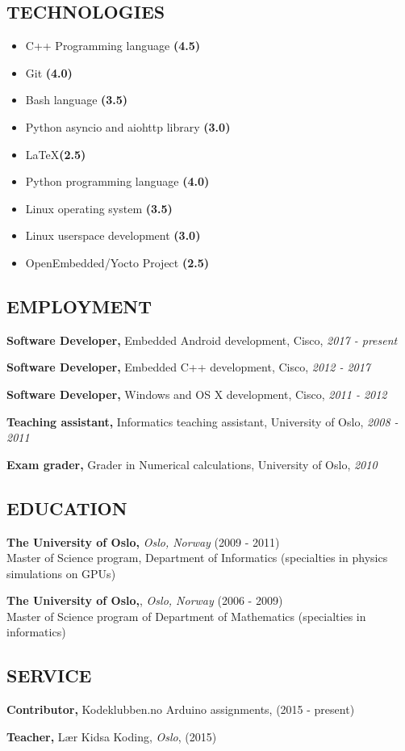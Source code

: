 \documentclass{article}
\begin{document}
\subsection*{TECHNOLOGIES}

\begin{multicols}{2}

  \begin{itemize}
    \item C++ Programming language {\bf (4.5)}
    \item Git {\bf (4.0)}
    \item Bash language {\bf (3.5)}
    \item Python asyncio and aiohttp library {\bf (3.0)}
    \item \LaTeX {\bf (2.5)}
    \item Python programming language {\bf (4.0)}
    \item Linux operating system {\bf (3.5)}
    \item Linux userspace development {\bf (3.0)}
    \item OpenEmbedded/Yocto Project {\bf (2.5)}
  \end{itemize}
\end{multicols}

\subsection*{EMPLOYMENT}

\begin{addmargin}[2em]{0em}
  {\bf Software Developer,} Embedded Android development, Cisco, {\it 2017 - present}

  {\bf Software Developer,} Embedded C++ development, Cisco, {\it 2012 - 2017}

  {\bf Software Developer,} Windows and OS X development, Cisco, {\it 2011 - 2012}

  {\bf Teaching assistant,} Informatics teaching assistant, University of Oslo, {\it 2008 - 2011}

  {\bf Exam grader,} Grader in Numerical calculations, University of Oslo, {\it 2010}
\end{addmargin}

\subsection*{EDUCATION}

\begin{addmargin}[2em]{0em}
  {\bf The University of Oslo,}  {\it Oslo, Norway} (2009 - 2011) \\
  Master of Science program, Department of Informatics (specialties in physics simulations on GPUs)

  {\bf The University of Oslo,}, {\it Oslo, Norway} (2006 - 2009) \\
  Master of Science program of Department of Mathematics (specialties in informatics)
\end{addmargin}

\subsection*{SERVICE}

\begin{addmargin}[2em]{0em}
  {\bf Contributor,} Kodeklubben.no Arduino assignments, (2015 - present)

  {\bf Teacher,} L\ae r Kidsa Koding, {\it Oslo}, (2015)
\end{addmargin}
\end{document}
